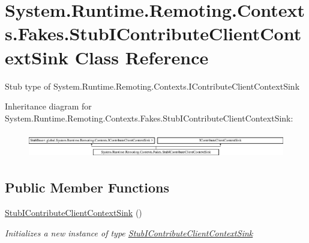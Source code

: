 \hypertarget{class_system_1_1_runtime_1_1_remoting_1_1_contexts_1_1_fakes_1_1_stub_i_contribute_client_context_sink}{\section{System.\-Runtime.\-Remoting.\-Contexts.\-Fakes.\-Stub\-I\-Contribute\-Client\-Context\-Sink Class Reference}
\label{class_system_1_1_runtime_1_1_remoting_1_1_contexts_1_1_fakes_1_1_stub_i_contribute_client_context_sink}
}


Stub type of System.\-Runtime.\-Remoting.\-Contexts.\-I\-Contribute\-Client\-Context\-Sink 


Inheritance diagram for System.\-Runtime.\-Remoting.\-Contexts.\-Fakes.\-Stub\-I\-Contribute\-Client\-Context\-Sink\-:\begin{figure}[H]
\begin{center}
\leavevmode
\includegraphics[height=1.135903cm]{class_system_1_1_runtime_1_1_remoting_1_1_contexts_1_1_fakes_1_1_stub_i_contribute_client_context_sink}
\end{center}
\end{figure}
\subsection*{Public Member Functions}
\begin{DoxyCompactItemize}
\item 
\hyperlink{class_system_1_1_runtime_1_1_remoting_1_1_contexts_1_1_fakes_1_1_stub_i_contribute_client_context_sink_a8ddcf00381e1af370e1aeeda9ab289a3}{Stub\-I\-Contribute\-Client\-Context\-Sink} ()
\begin{DoxyCompactList}\small\item\em Initializes a new instance of type \hyperlink{class_system_1_1_runtime_1_1_remoting_1_1_contexts_1_1_fakes_1_1_stub_i_contribute_client_context_sink}{Stub\-I\-Contribute\-Client\-Context\-Sink}\end{DoxyCompactList}\end{DoxyCompactItemize}
